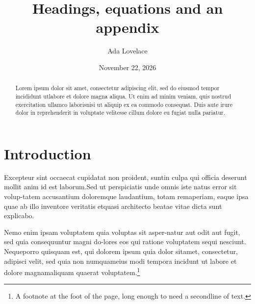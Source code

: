 \documentclass[reprint,aps,pra,superscriptaddress,10pt,nofootinbib,nobalancelastpage,linenumbers]{revtex4-2}
\begin{document}
\title{Headings, equations and an appendix}
\author{Ada Lovelace}
\date{November 22, 2026}
\begin{abstract}
Lorem ipsum dolor sit amet, consectetur adipiscing elit, sed do eiusmod tempor incididunt ut\linebreak labore et dolore magna aliqua. Ut enim ad minim veniam, quis nostrud exercitation ullamco laboris\linebreak nisi ut aliquip ex ea commodo consequat. Duis aute irure dolor in reprehenderit in voluptate velit\linebreak esse cillum dolore eu fugiat nulla pariatur.
\end{abstract}
\maketitle
\section{Introduction}
Excepteur sint occaecat cupidatat non proident, sunt\linebreak in culpa qui officia deserunt mollit anim id est laborum.\linebreak Sed ut perspiciatis unde omnis iste natus error sit volup-\linebreak tatem accusantium doloremque laudantium, totam rem\linebreak aperiam, eaque ipsa quae ab illo inventore veritatis et\linebreak quasi architecto beatae vitae dicta sunt explicabo.

Nemo enim ipsam voluptatem quia voluptas sit asper-\linebreak natur aut odit aut fugit, sed quia consequuntur magni do-\linebreak lores eos qui ratione voluptatem sequi nesciunt. Neque\linebreak porro quisquam est, qui dolorem ipsum quia dolor sit\linebreak amet, consectetur, adipisci velit, sed quia non numquam\linebreak eius modi tempora incidunt ut labore et dolore magnam\linebreak aliquam quaerat voluptatem.\footnote{A footnote at the foot of the page, long enough to need a second\linebreak line of text.}
\end{document}
